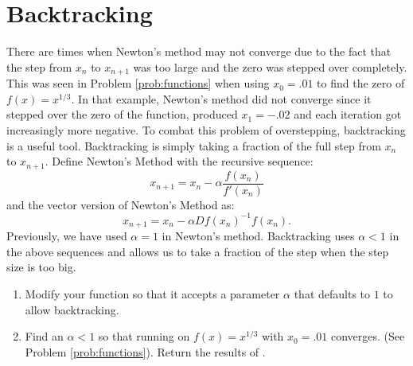 \section*{Backtracking}
There are times when Newton's method may not converge due to the fact that the step from $x_n$ to $x_{n+1}$ was too large and the zero was stepped over completely.  This was seen in Problem \ref{prob:functions} when using $x_0 = .01$ to find the zero of $f(x)=x^{1/3}$. In that example, Newton's method did not converge since it stepped over the zero of the function, produced $x_1 = -.02$ and each iteration got increasingly more negative.  To combat this problem of overstepping, backtracking is a useful tool.  Backtracking is simply taking a fraction of the full step from $x_n$ to $x_{n+1}$.  Define Newton's Method with the recursive sequence:
\[
x_{n+1} = x_n - \alpha\frac{f(x_n)}{f'(x_n)}
\]
and the vector version of Newton's Method as:
\[
x_{n+1} = x_n - \alpha{Df(x_n)}^{-1}{f(x_n)}.
\]
Previously, we have used $\alpha = 1$ in Newton's method.  Backtracking uses $\alpha < 1$ in the above sequences and allows us to take a fraction of the step when the step size is too big.
\begin{problem}
\begin{enumerate}

\item Modify your  function so that it accepts a parameter $\alpha$ that defaults to $1$ to allow backtracking.
\item Find an $\alpha < 1$ so that running  on $f(x)=x^{1/3}$ with $x_0=.01$ converges.
(See Problem \ref{prob:functions}).
Return the results of .


\end{enumerate}
\end{problem}

